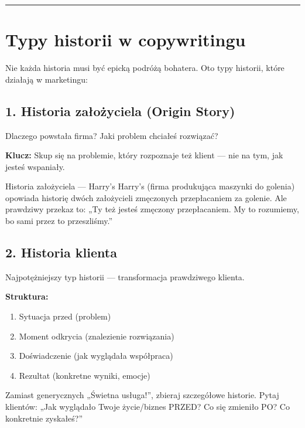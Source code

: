 \documentclass[
  12pt,
  a4paper,
  twoside,
  openright,
  12pt,
  DIV=12,
  BCOR=12mm]{scrbook}
\providecommand{\tightlist}{%
  \setlength{\itemsep}{0pt}\setlength{\parskip}{0pt}}\usepackage{longtable,booktabs,array}
\newcommand{\decoline}{%
  \begin{center}
    \textcolor{bordergray}{\rule{0.3\textwidth}{0.5pt}}
  \end{center}
}
\begin{document}
\decoline

\section{Typy historii w
copywritingu}\label{typy-historii-w-copywritingu}

Nie każda historia musi być epicką podróżą bohatera. Oto typy historii,
które działają w marketingu:

\subsection{1. Historia założyciela (Origin
Story)}\label{historia-zaux142oux17cyciela-origin-story}

Dlaczego powstała firma? Jaki problem chciałeś rozwiązać?

\textbf{Klucz:} Skup się na problemie, który rozpoznaje też klient ---
nie na tym, jak jesteś wspaniały.

\begin{przyklad}{Historia założyciela --- Harry's}
Harry's (firma produkująca maszynki do golenia) opowiada historię dwóch założycieli zmęczonych przepłacaniem za golenie. Ale prawdziwy przekaz to: „Ty też jesteś zmęczony przepłacaniem. My to rozumiemy, bo sami przez to przeszliśmy.”
\end{przyklad}

\subsection{2. Historia klienta}\label{historia-klienta}

Najpotężniejszy typ historii --- transformacja prawdziwego klienta.

\textbf{Struktura:}

\begin{enumerate}
\def\labelenumi{\arabic{enumi}.}
\tightlist
\item
  Sytuacja przed (problem)
\item
  Moment odkrycia (znalezienie rozwiązania)
\item
  Doświadczenie (jak wyglądała współpraca)
\item
  Rezultat (konkretne wyniki, emocje)
\end{enumerate}

\begin{wskazowka}
Zamiast generycznych „Świetna usługa!”, zbieraj szczegółowe historie. Pytaj klientów: „Jak wyglądało Twoje życie/biznes PRZED? Co się zmieniło PO? Co konkretnie zyskałeś?”
\end{wskazowka}
\end{document}
